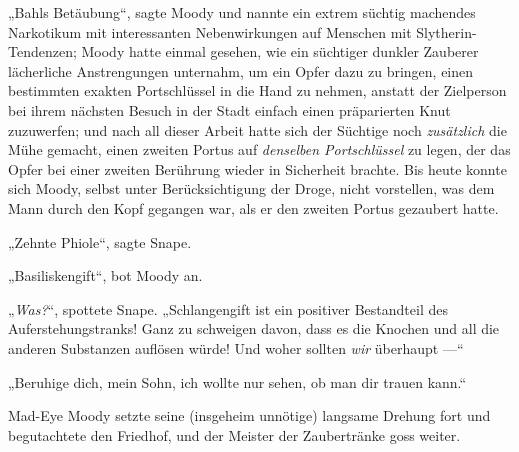 „Bahls Betäubung“, sagte Moody und nannte ein extrem süchtig machendes Narkotikum mit interessanten Nebenwirkungen auf Menschen mit Slytherin-Tendenzen; Moody hatte einmal gesehen, wie ein süchtiger dunkler Zauberer lächerliche Anstrengungen unternahm, um ein Opfer dazu zu bringen, einen bestimmten exakten Portschlüssel in die Hand zu nehmen, anstatt der Zielperson bei ihrem nächsten Besuch in der Stadt einfach einen präparierten Knut zuzuwerfen; und nach all dieser Arbeit hatte sich der Süchtige noch \emph{zusätzlich} die Mühe gemacht, einen zweiten Portus auf \emph{denselben Portschlüssel} zu legen, der das Opfer bei einer zweiten Berührung wieder in Sicherheit brachte. Bis heute konnte sich Moody, selbst unter Berücksichtigung der Droge, nicht vorstellen, was dem Mann durch den Kopf gegangen war, als er den zweiten Portus gezaubert hatte.

„Zehnte Phiole“, sagte Snape.

„Basiliskengift“, bot Moody an.

„\emph{Was?}“, spottete Snape.
„Schlangengift ist ein positiver Bestandteil des Auferstehungstranks! Ganz zu schweigen davon, dass es die Knochen und all die anderen Substanzen auflösen würde! Und woher sollten \emph{wir} überhaupt —“

„Beruhige dich, mein Sohn, ich wollte nur sehen, ob man dir trauen kann.“

Mad-Eye Moody setzte seine (insgeheim unnötige) langsame Drehung fort und begutachtete den Friedhof, und der Meister der Zaubertränke goss weiter.

